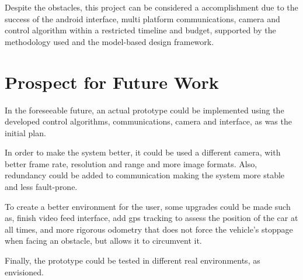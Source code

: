 Despite the obstacles, this project can be considered a accomplishment due to
the success of the android interface, multi platform communications, camera and
control algorithm within a restricted timeline and budget, supported by the
methodology used and the model-based design framework.
%
\section{Prospect for Future Work}%
\label{ch:conclusion-future-work}
In the foreseeable future, an actual prototype could be implemented using the
developed control algorithms, communications, camera and interface, as was the
initial plan.

In order to make the system better, it could be used a different camera, with
better frame rate, resolution and range and more image formats. Also, redundancy could be added to communication making the system more stable and less fault-prone. 

To create a better environment for the user, some upgrades could be made such
as, finish video feed interface, add \gls{gps} tracking to assess the position of the car at all times, and more rigorous odometry that does not
force the vehicle's stoppage when facing an obstacle, but allows it to circumvent it.

Finally, the prototype could be tested in different real environments, as envisioned.
